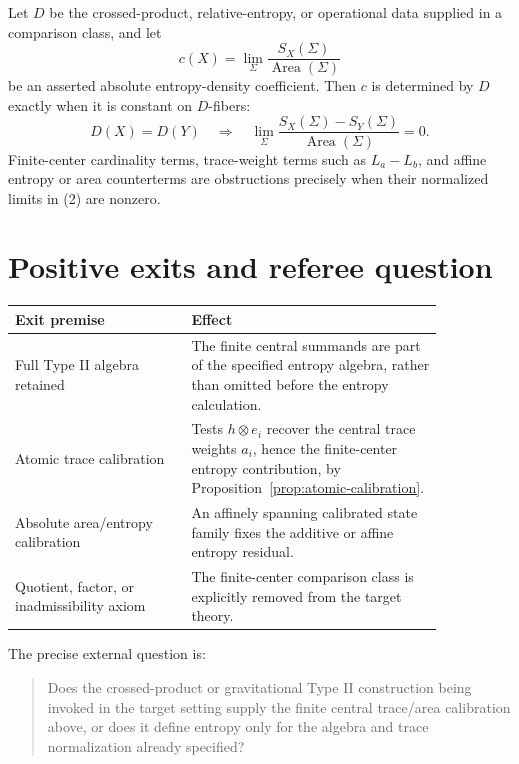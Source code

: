 \documentclass[12pt]{article}
\theoremstyle{remark}
\begin{document}
Let \(D\) be the crossed-product, relative-entropy, or operational data
supplied in a comparison class, and let
\[
  c(X)=\lim_\Sigma\frac{S_X(\Sigma)}{\operatorname{Area}(\Sigma)}
\]
be an asserted absolute entropy-density coefficient.  Then \(c\) is determined
by \(D\) exactly when it is constant on \(D\)-fibers:
\[
  D(X)=D(Y)
  \quad\Longrightarrow\quad
  \lim_\Sigma
  \frac{S_X(\Sigma)-S_Y(\Sigma)}
       {\operatorname{Area}(\Sigma)}
  =0 .
  \tag{2}
\]
Finite-center cardinality terms, trace-weight terms such as \(L_a-L_b\), and
affine entropy or area counterterms are obstructions precisely when their
normalized limits in (2) are nonzero.

\section{Positive exits and referee question}

\begin{center}
\begin{tabular}{p{0.35\linewidth}p{0.50\linewidth}}
\toprule
Exit premise & Effect \\
\midrule
Full Type II algebra retained & The finite central summands are part of the
specified entropy algebra, rather than omitted before the entropy calculation.
\\
\addlinespace
Atomic trace calibration & Tests \(h\otimes e_i\) recover the central trace
weights \(a_i\), hence the finite-center entropy contribution, by
Proposition~\ref{prop:atomic-calibration}. \\
\addlinespace
Absolute area/entropy calibration & An affinely spanning calibrated state
family fixes the additive or affine entropy residual. \\
\addlinespace
Quotient, factor, or inadmissibility axiom & The finite-center comparison
class is explicitly removed from the target theory. \\
\bottomrule
\end{tabular}
\end{center}

The precise external question is:

\begin{quote}
Does the crossed-product or gravitational Type II construction being invoked
in the target setting supply the finite central trace/area calibration above,
or does it define entropy only for the algebra and trace normalization already
specified?
\end{quote}
\end{document}

